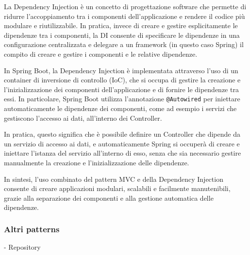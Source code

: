 La Dependency Injection è un concetto di progettazione software che permette di ridurre l'accoppiamento tra i componenti dell'applicazione e rendere il codice più modulare e riutilizzabile. In pratica, invece di creare e gestire esplicitamente le dipendenze tra i componenti, la DI consente di specificare le dipendenze in una configurazione centralizzata e delegare a un framework (in questo caso Spring) il compito di creare e gestire i componenti e le relative dipendenze.

In Spring Boot, la Dependency Injection è implementata attraverso l'uso di un container di inversione di controllo (IoC), che si occupa di gestire la creazione e l'inizializzazione dei componenti dell'applicazione e di fornire le dipendenze tra essi. In particolare, Spring Boot utilizza l'annotazione \texttt{@Autowired} per iniettare automaticamente le dipendenze dei componenti, come ad esempio i servizi che gestiscono l'accesso ai dati, all'interno dei Controller.

In pratica, questo significa che è possibile definire un Controller che dipende da un servizio di accesso ai dati, e automaticamente Spring si occuperà di creare e iniettare l'istanza del servizio all'interno di esso, senza che sia necessario gestire manualmente la creazione e l'inizializzazione delle dipendenze.

In sintesi, l'uso combinato del pattern MVC e della Dependency Injection consente di creare applicazioni modulari, scalabili e facilmente manutenibili, grazie alla separazione dei componenti e alla gestione automatica delle dipendenze.

\subsubsection{Altri patterns}
- Repository

